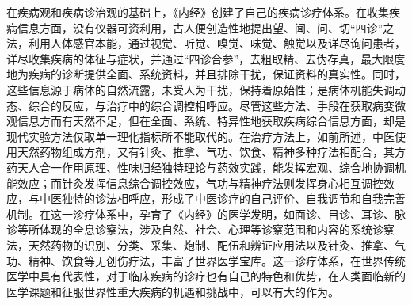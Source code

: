\documentclass[draft,12pt]{ctexbook}
\begin{document}
在疾病观和疾病诊治观的基础上，《内经》创建了自己的疾病诊疗体系。在收集疾病信息方面，没有仪器可资利用，古人便创造性地提出望、闻、问、切“四诊”之法，利用人体感官本能，通过视觉、听觉、嗅觉、味觉、触觉以及详尽询问患者，详尽收集疾病的体征与症状，并通过“四诊合参”，去粗取精、去伪存真，最大限度地为疾病的诊断提供全面、系统资料，并且排除干扰，保证资料的真实性。同时，这些信息源于病体的自然流露，未受人为干扰，保持着原始性；是病体机能失调动态、综合的反应，与治疗中的综合调控相呼应。尽管这些方法、手段在获取病变微观信息方而有天然不足，但在全面、系统、特异性地获取疾病综合信息方面，却是现代实验方法仅取单一理化指标所不能取代的。在治疗方法上，如前所述，中医使用天然药物组成方剂，又有针灸、推拿、气功、饮食、精神多种疗法相配合，其方药天人合一作用原理、性味归经独特理论与药效实践，能发挥宏观、综合地协调机能效应；而针灸发挥信息综合调控效应，气功与精神疗法则发挥身心相互调控效应，与中医独特的诊法相呼应，形成了中医诊疗的自己评价、自我调节和自我完善机制。在这一沴疗体系中，孕育了《内经》的医学发明，如面诊、目诊、耳诊、脉诊等所体现的全息诊察法，涉及自然、社会、心理等诊察范围和内容的系统诊察法，天然药物的识别、分类、采集、炮制、配伍和辨证应用法以及针灸、推拿、气功、精神、饮食等无创伤疗法，丰富了世界医学宝库。这一诊疗体系，在世界传统医学中具有代表性，对于临床疾病的诊疗也有自己的特色和优势，在人类面临新的医学课题和征服世界性重大疾病的机遇和挑战中，可以有大的作为。

\ifx \allfiles \undefined
\end{document}

